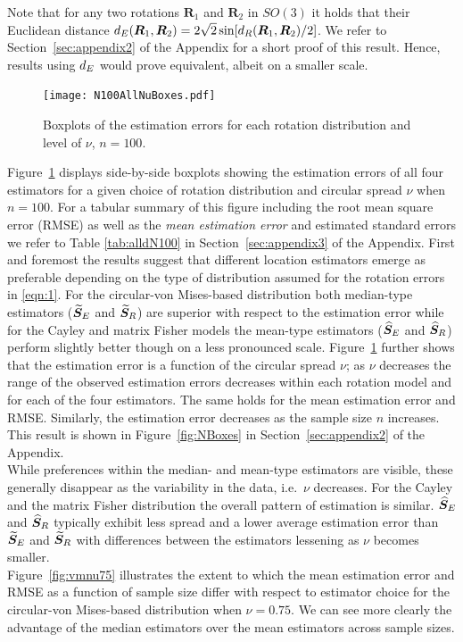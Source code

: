\noindent Note that for any two rotations $\bm R_1$ and $\bm R_2$ in $SO(3)$ it holds that their Euclidean distance ${d_E}(\bm R_1,\bm R_2)=2\sqrt{2}\sin[{d_R}(\bm R_1,\bm R_2)/2]$. We refer to Section~\ref{sec:appendix2} of the Appendix for a short proof of this result.  Hence, results using ${d_E}$ would prove equivalent, albeit on a smaller scale.   
\begin{figure}[h!]
\centering
\texttt{[image: N100AllNuBoxes.pdf]}
\caption{Boxplots of the estimation errors for each rotation distribution and level of $\nu$,  $n=100$.}
\label{fig:NuBoxes}
\end{figure}
Figure~\ref{fig:NuBoxes} displays side-by-side boxplots showing the estimation errors of all four estimators for a given choice of rotation distribution and circular spread $\nu$ when  $n=100$.   For a tabular summary of this figure including the root mean square error (RMSE)  as well as the \textit{mean estimation error} and estimated standard errors we refer to Table \ref{tab:alldN100} in Section~\ref{sec:appendix3} of the Appendix. 
First and foremost the results suggest that different location estimators emerge as preferable depending on the type of distribution assumed for the rotation errors in \eqref{eqn:1}.  For the circular-von Mises-based distribution both median-type estimators (${\widetilde{\bm S}_E}$ and ${\widetilde{\bm S}_R}$) are superior with respect to the estimation error while for the Cayley and matrix Fisher models the mean-type estimators (${\widehat{\bm S}_E}$ and ${\widehat{\bm S}_R}$) perform slightly better though on a less pronounced scale.   Figure~\ref{fig:NuBoxes} further shows that the estimation error is a function of the circular spread $\nu$; as $\nu$ decreases the range of the observed estimation errors decreases within each rotation model and for each of the four estimators. The same holds for the mean estimation error and RMSE.  Similarly, the estimation error decreases as the sample size $n$ increases. This result is shown in Figure~\ref{fig:NBoxes} in Section~\ref{sec:appendix2} of the Appendix.\\
While preferences within the median- and mean-type estimators are visible, these generally disappear as the variability in the data, i.e.~$\nu$ decreases.  For the Cayley and the matrix Fisher distribution the overall pattern of estimation is similar. ${\widehat{\bm S}_E}$ and ${\widehat{\bm S}_R}$ typically exhibit less spread and a lower average estimation error than ${\widetilde{\bm S}_E}$ and ${\widetilde{\bm S}_R}$ with differences between the estimators lessening as $\nu$ becomes smaller.\\
Figure~\ref{fig:vmnu75} illustrates the extent to which the mean estimation error and RMSE as a function of sample size differ with respect to estimator choice for the circular-von Mises-based distribution when $\nu=0.75$.  We can see more clearly the advantage of the median estimators over the mean estimators across sample sizes.
 
